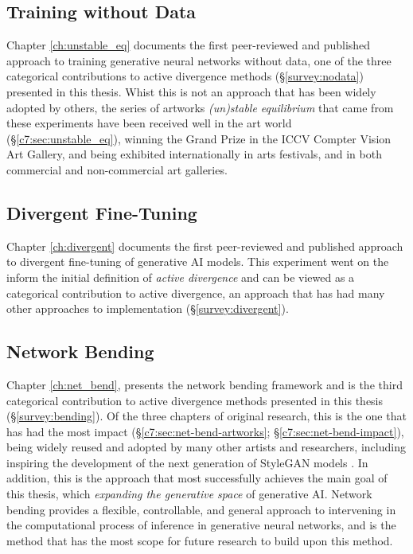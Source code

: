 \subsection{Training without Data}

Chapter \ref{ch:unstable_eq} documents the first peer-reviewed and published approach to training generative neural networks without data, one of the three categorical contributions to active divergence methods (\S \ref{survey:nodata}) presented in this thesis.
Whist this is not an approach that has been widely adopted by others, the series of artworks \textit{(un)stable equilibrium} that came from these experiments have been received well in the art world (\S \ref{c7:sec:unstable_eq}), winning the Grand Prize in the ICCV Compter Vision Art Gallery, and being exhibited internationally in arts festivals, and in both commercial and non-commercial art galleries. 

\subsection{Divergent Fine-Tuning}

Chapter \ref{ch:divergent} documents the first peer-reviewed and published approach to divergent fine-tuning of generative AI models.
This experiment went on the inform the initial definition of \textit{active divergence} \citep{berns2020bridging} and can be viewed as a categorical contribution to active divergence, an approach that has had many other approaches to implementation (\S \ref{survey:divergent}).


\subsection{Network Bending}

Chapter \ref{ch:net_bend}, presents the network bending framework and is the third categorical contribution to active divergence methods presented in this thesis (\S \ref{survey:bending}).
Of the three chapters of original research, this is the one that has had the most impact  (\S \ref{c7:sec:net-bend-artworks}; \S \ref{c7:sec:net-bend-impact}), being widely reused and adopted by many other artists and researchers, including inspiring the development of the next generation of StyleGAN models \citep{karras2021alias}.
In addition, this is the approach that most successfully achieves the main goal of this thesis, which \textit{expanding the generative space} of generative AI. 
Network bending provides a flexible, controllable, and general approach to intervening in the computational process of inference in generative neural networks, and is the method that has the most scope for future research to build upon this method.

